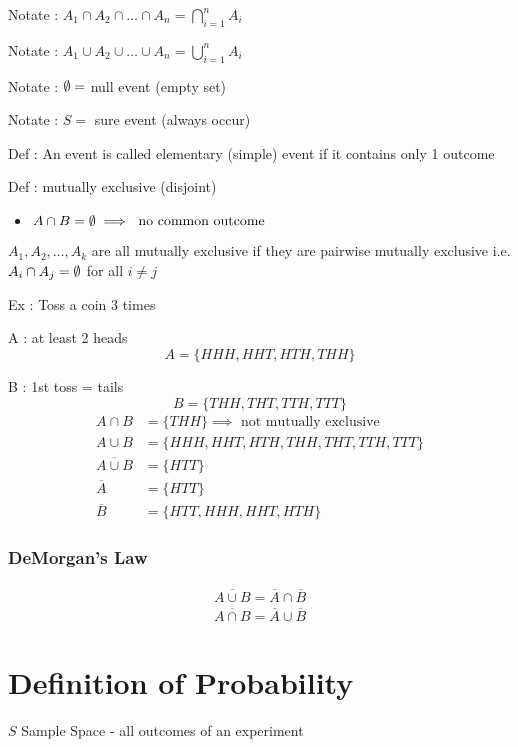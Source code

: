 Notate : $A_1 \cap A_2 \cap \ldots \cap A_n = \bigcap_{i = 1}^n A_i$

Notate : $A_1 \cup A_2 \cup \ldots \cup A_n = \bigcup_{i = 1}^n A_i$

Notate : $\emptyset = $ null event (empty set)

Notate : $S = $ sure event (always occur)

Def : An event is called elementary (simple) event if it contains only 1 outcome

Def : mutually exclusive (disjoint)

\begin{itemize}
    \item $A \cap B = \emptyset \implies \text{ no common outcome}$
\end{itemize}

$A_1, A_2, \ldots, A_k$ are all mutually exclusive if they are pairwise mutually exclusive i.e. $A_i \cap A_j = \emptyset$ for all $i \not= j$

Ex : Toss a coin 3 times

A : at least 2 heads
\[
    A = \{HHH, HHT, HTH, THH \}
\] 

B : 1st toss = tails
\[
    B = \{ THH, THT, TTH, TTT \}
\] 
\begin{align*}
    A \cap B &= \{ THH \} \implies \text{ not mutually exclusive} \\
    A \cup B &= \{ HHH, HHT, HTH, THH, THT, TTH, TTT \} \\
    \overline{A \cup B} &= \{ HTT \} \\
    \overline{A} &= \{ HTT \} \\
    \overline{B} &= \{ HTT, HHH, HHT, HTH \}
\end{align*}
\subsubsection*{DeMorgan's Law}

\begin{align*}
    \overline{A \cup B} = \overline{A} \cap \overline{B} \\
\overline{A \cap B} = \overline{A} \cup \overline{B}
\end{align*}

\section*{Definition of Probability}

$S$ Sample Space - all outcomes of an experiment

